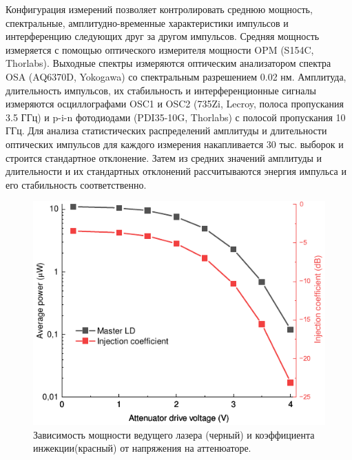 Конфигурация измерений позволяет контролировать среднюю мощность, спектральные, амплитудно-временные характеристики импульсов и интерференцию следующих друг за другом импульсов. Средняя мощность измеряется с помощью оптического измерителя мощности OPM (S154C, Thorlabs). Выходные спектры измеряются оптическим анализатором спектра OSA (AQ6370D, Yokogawa) со спектральным разрешением 0.02 нм. Амплитуда, длительность импульсов, их стабильность и интерференционные сигналы измеряются осциллографами OSC1 и OSC2 (735Zi, Lecroy, полоса пропускания 3.5 ГГц) и p-i-n фотодиодами (PDI35-10G, Thorlabs) с полосой пропускания 10 ГГц. Для анализа статистических распределений амплитуды и длительности оптических импульсов для каждого измерения накапливается 30 тыс. выборок и строится стандартное отклонение. Затем из средних значений амплитуды и длительности и их стандартных отклонений рассчитываются энергия импульса и его стабильность соответственно.
\begin{figure}
	\centering
	\includegraphics[width=\linewidth]{images/master_power.pdf}
	\caption{Зависимость мощности ведущего лазера (черный) и коэффициента инжекции(красный) от напряжения на аттенюаторе.}
\end{figure}
\label{fig:master_power}
